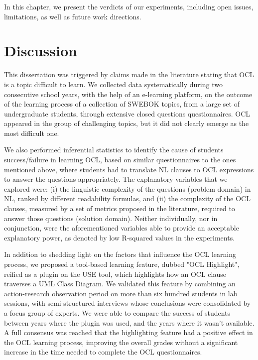 {In this chapter, we present the verdicts of our experiments, including open issues, limitations, as well as future work directions.}

\section{Discussion}

This dissertation was triggered by claims made in the literature stating that OCL is a topic difficult to learn. We collected data systematically during two consecutive school years, with the help of an e-learning platform, on the outcome of the learning process of a collection of SWEBOK topics, from a large set of undergraduate students, through extensive closed questions questionnaires. OCL appeared in the group of challenging topics, but it did not clearly emerge as the most difficult one.

We also performed inferential statistics to identify the cause of students success/failure in learning OCL, based on similar questionnaires to the ones mentioned above, where students had to translate NL clauses to OCL expressions to answer the questions appropriately. The explanatory variables that we explored were: (i) the linguistic complexity of the questions (problem domain) in NL, ranked by different readability formulas, and (ii) the complexity of the OCL clauses, measured by a set of metrics proposed in the literature, required to answer those questions (solution domain). Neither individually, nor in conjunction, were the aforementioned variables able to provide an acceptable explanatory power, as denoted by low R-squared values in the experiments. 

In addition to shedding light on the factors that influence the OCL learning process, we proposed a tool-based learning feature, dubbed "OCL Highlight", reified as a plugin on the USE tool, which highlights how an OCL clause traverses a UML Class Diagram. We validated this feature by combining an action-research observation period on more than six hundred students in lab sessions, with semi-structured interviews whose conclusions were consolidated by a focus group of experts. We were able to compare the success of students between years where the plugin was used, and the years where it wasn't available. A full consensus was reached that the highlighting feature had a positive effect in the OCL learning process, improving the overall grades without a significant increase in the time needed to complete the OCL questionnaires.

